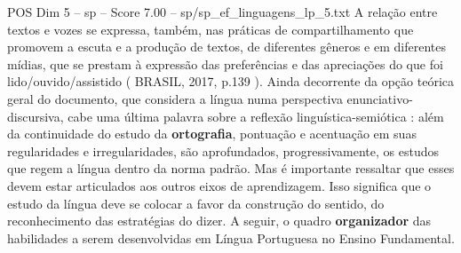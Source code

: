 \begin{textsample}{POS Dim 5 – sp – Score 7.00 – sp/sp\_ef\_linguagens\_lp\_5.txt}
A relação entre textos e vozes se expressa, também, nas práticas de compartilhamento que promovem a escuta e a produção de textos, de diferentes gêneros e em diferentes mídias, que se prestam à expressão das preferências e das apreciações do que foi lido/ouvido/assistido ( BRASIL, 2017, p.139 ).
Ainda decorrente da opção teórica geral do documento, que considera a língua numa perspectiva enunciativo-discursiva, cabe uma última palavra sobre a reflexão linguística-semiótica : além da continuidade do estudo da \textbf{ortografia}, pontuação e acentuação em suas regularidades e irregularidades, são aprofundados, progressivamente, os estudos que regem a língua dentro da norma padrão.
Mas é importante ressaltar que esses devem estar articulados aos outros eixos de aprendizagem.
Isso significa que o estudo da língua deve se colocar a favor da construção do sentido, do reconhecimento das estratégias do dizer.
A seguir, o quadro \textbf{organizador} das habilidades a serem desenvolvidas em Língua Portuguesa no Ensino Fundamental.

\end{textsample}
